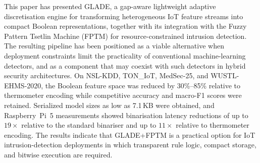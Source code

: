 \documentclass[journal,twoside,web]{ieeecolor}
\begin{document}
This paper has presented GLADE, a gap-aware lightweight adaptive
discretisation engine for transforming heterogeneous IoT feature
streams into compact Boolean representations, together with its
integration with the Fuzzy Pattern Tsetlin Machine (FPTM) for
resource-constrained intrusion detection. The resulting pipeline has
been positioned as a viable alternative when deployment constraints
limit the practicality of conventional machine-learning detectors, and
as a component that may coexist with such detectors in hybrid security
architectures. On NSL-KDD, TON\_IoT, MedSec-25, and WUSTL-EHMS-2020,
the Boolean feature space was reduced by 30\%--85\% relative to
thermometer encoding while competitive accuracy and macro-F1
scores were retained. Serialized model sizes as low as 7.1\,KB were
obtained, and Raspberry~Pi~5 measurements showed binarisation latency
reductions of up to $19\times$ relative to the standard binariser and
up to $11\times$ relative to thermometer encoding. The results indicate
that GLADE+FPTM is a practical option for IoT intrusion-detection
deployments in which transparent rule logic, compact storage, and
bitwise execution are required.



\end{document}
